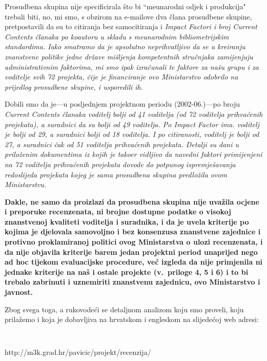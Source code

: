  \smallskip 
Prosudbena skupina nije specificirala \v sto bi ``me\dj unarodni 
odjek i produkcija" trebali biti, no, mi smo, s obzirom 
na e-mailove dva \v clana prosudbene skupine, pretpostavili
da su to citiranja bez samocitiranja i \it Impact Factor\/\rm i i 
broj \it Current Contents \/\rm \v clanaka po koautoru u skladu s 
me\dj unarodnim bibliometrijskim standardima. Iako smatramo 
da je apsolutno neprihvatljivo da se u kreiranju znanstvene 
politike jedne dr\v zave mi\v sljenja kompetentnih stru\v cnjaka 
zamijenjuju administrativnim faktorima, mi smo ipak 
izra\v cunali te faktore za na\v su grupu i za voditelje svih 72 
projekta, \v cije je financiranje ovo \it Ministarstvo \/\rm 
odobrilo na prijedlog prosudbene skupine, i usporedili ih.

\smallskip 
Dobili smo da je---u posljednjem projektnom periodu (2002-06.)---po broju 
\it Current Contents \/\rm \v clanaka voditelj 
bolji od 41 voditelja (od 72 voditelja prihva\'cenih projekata), 
a suradnici da su bolji od 49 voditelja. Po  \it Impact Factor\/\rm 
ima. voditelj je bolji od 29, a suradnici bolji od 18 voditelja. 
I po citiranosti, voditelj je bolji od 27, a suradnici \v cak od
51 voditelja prihva\'cenih projekata. Detalji su dani u prilo\v zenim 
dokumentima iz kojih je tako\dj er vidljivo da navedni faktori primijenjeni 
na 72 voditelja prihva\'cenih projekata dovode do potpunog ispremje\v savanja
redoslijeda projekata kojeg je sama prosudbena skupina predlo\v zila 
ovom \it Ministarstvu\/\rm.
 
\smallskip 
\bf Dakle, ne samo da proizlazi da prosudbena 
skupina nije uva\v zila ocjene i preporuke recenzenata, 
ni brojne dostupne podatke o visokoj znanstvenoj 
kvaliteti voditelja i suradnika,  i da je uvela kriterije 
po kojima je djelovala samovoljno i bez konsenzusa znanstvene 
zajednice i protivno proklamiranoj politici ovog 
Ministarstva o ulozi recenzenata, i da nije objavila 
kriterije barem jedan projektni period unaprijed nego ad 
hoc tijekom evaluacijske procedure, ve\'c 
izgleda da nije primjenila ni jednake kriterije na na\v s i 
ostale projekte (v.~priloge 4, 5 i 6) i to bi trebalo zabrinuti 
i uznemiriti znanstvenu zajednicu, ovo Ministarstvo i javnost.\rm  

\medskip
Zbog svega toga, a rukovode\'ci se detaljnom analizom koju 
smo proveli, koju prila\v zemo i koja je dobavljiva na 
hrvatskom i engleskom na slijede\'coj web adresi:

\smallskip \tt
\parindent=0pt
\centerline{http://m3k.grad.hr/pavicic/projekt/recenzija/}

